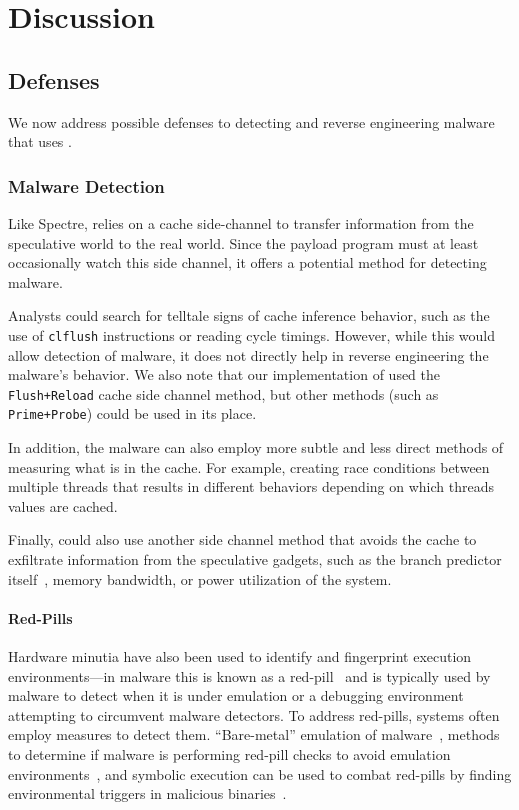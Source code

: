 
\section{Discussion}

\subsection{Defenses}
We now address possible defenses to detecting and reverse engineering malware that uses
\speculake. 

\subsubsection{Malware Detection}
\label{subsubsec:malware}
Like Spectre, \speculake relies on a cache side-channel to transfer
information from the speculative world to the real world. Since the payload
program must at least occasionally watch this side channel, it offers a
potential method for detecting \speculake malware.

Analysts could search for telltale signs of cache inference behavior, such as
the use of \texttt{clflush} instructions or reading cycle timings. However,
while this would allow detection of \speculake malware, it does not directly
help in reverse engineering the malware's behavior. We also note that our
implementation of \speculake used the \texttt{Flush+Reload} cache side channel
method, but other methods (such as \texttt{Prime+Probe}) could be used in its
place.

In addition, the malware can also employ more subtle and less direct methods
of measuring what is in the cache. For example, creating race conditions between
multiple threads that results in different behaviors depending on which threads
values are cached.

Finally, \speculake could also use another side channel method that
avoids the cache
to exfiltrate information from the speculative gadgets, such as the branch
predictor itself~\cite{evtyushkin2018branchscope}, memory bandwidth, or power
utilization of the system.

\paragraph{Red-Pills}
Hardware minutia have also been used to identify and fingerprint execution
environments---in malware this is known as a red-pill~\cite{red-pill} and is
typically used by malware to detect when it is under emulation or a debugging
environment~\cite{lindorfer2011detecting, balzarotti2010efficient,
paleari2009fistful} attempting to circumvent malware detectors. To address
red-pills, systems often employ measures to detect them. ``Bare-metal''
emulation of malware~\cite{kirat2011barebox}, methods to determine if malware is
performing red-pill checks to avoid emulation
environments~\cite{kirat2014barecloud}, and symbolic execution can be used to
combat red-pills by finding environmental triggers in malicious
binaries~\cite{schwartz2010all}. 

